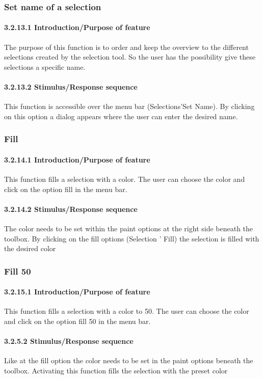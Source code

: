 \documentclass[titlepage,12pt]{scrartcl}
\begin{document}
\subsubsection{Set name of a selection}
\paragraph{3.2.13.1	Introduction/Purpose of feature}
The purpose of this function is to order and keep the overview to the different selections created by the selection tool. So the user has the possibility give these selections a specific name.
\paragraph{3.2.13.2	Stimulus/Response sequence}
This function is accessible over the menu bar (Selections'Set Name). By clicking on this option a dialog appears where the user can enter the desired name.

\subsubsection{Fill}
\paragraph{3.2.14.1	Introduction/Purpose of feature}
This function fills a selection with a color. The user can choose the color and click on the option fill in the menu bar.
\paragraph{3.2.14.2	Stimulus/Response sequence}
The color needs to be set within the paint options at the right side beneath the toolbox. By clicking on the fill options (Selection ' Fill) the selection is filled with the desired color

\subsubsection{Fill 50}
\paragraph{3.2.15.1	Introduction/Purpose of feature}
This function fills a selection with a color to 50. The user can choose the color and click on the option fill 50 in the menu bar.
\paragraph{3.2.5.2	Stimulus/Response sequence}
Like at the fill option the color needs to be set in the paint options beneath the toolbox. Activating this function fills the selection with the preset color
\end{document}
